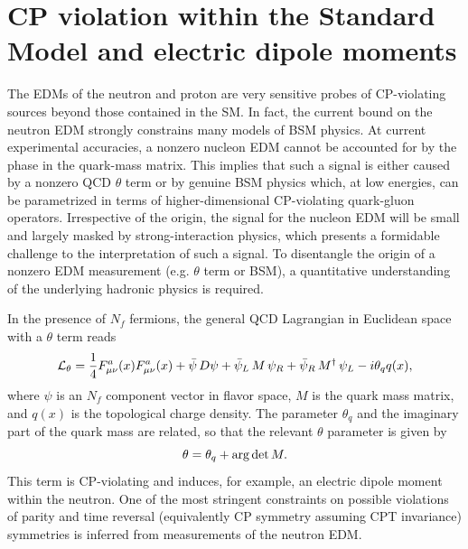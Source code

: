 \documentclass[aps,prc,twocolumn,showpacs,floatfix,nofootinbib,preprintnumbers,superscriptaddress,amsmath,amssymb]{revtex4-1}
\begin{document}
\section*{CP violation within the Standard Model and electric dipole moments}
The EDMs of the neutron and proton are very sensitive probes of CP-violating sources 
beyond those contained in the SM.
In fact, the current bound on the neutron EDM strongly constrains many models of BSM physics. 
At current experimental accuracies, a nonzero nucleon EDM cannot be accounted for by the phase 
in the quark-mass matrix. 
This implies that such a signal is either caused by a nonzero QCD $\theta$ term or 
by genuine BSM physics which, at low energies, 
can be parametrized in terms of higher-dimensional CP-violating quark-gluon operators. 
Irrespective of the origin, the signal for the nucleon EDM will be small and largely 
masked by strong-interaction physics, which presents a formidable challenge to the interpretation
of such a signal.
To disentangle the origin of a nonzero EDM measurement (e.g. $\theta$ term or BSM), 
a quantitative understanding of the underlying hadronic physics is required.

In the presence of $N_f$ fermions, the general QCD Lagrangian in Euclidean space with a $\theta$ term
reads
\begin{equation}
{\cal L_\theta}= {1\over 4} F_{\mu\nu}^a(x)F_{\mu\nu}^a(x)
+ \bar\psi\, D \psi
+ \bar\psi_L \,M\,\psi_R + \bar\psi_R \,M^\dagger\,\psi_L
- i \theta_q q(x),
\end{equation}
where $\psi$ is an $N_f$ component vector in flavor space, $M$ is the
quark mass matrix, and $q(x)$ is the topological charge density.  The parameter
$\theta_q$ and the imaginary part of the quark mass are related, so that the
relevant $\theta$ parameter is given by
\begin{equation}
\theta = \theta_q + {\rm arg}\,{\rm det}\, M.
\label{thetafe}
\end{equation} 
This term is CP-violating and induces, for example,  an electric dipole moment within the neutron.    
One of the most stringent constraints on possible violations of parity and time reversal 
(equivalently CP symmetry assuming CPT invariance) symmetries is inferred from
measurements of the neutron EDM.  
\end{document}
